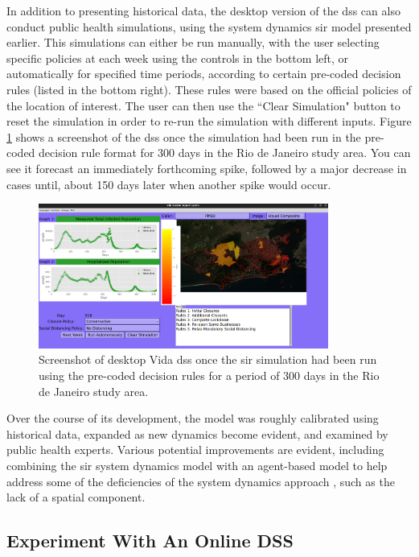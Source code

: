 In addition to presenting historical data, the desktop version of the \ac{dss} can also conduct public health simulations, using the system dynamics \ac{sir} model presented earlier. This simulations can either be run manually, with the user selecting specific policies at each week using the controls in the bottom left, or automatically for specified time periods, according to certain pre-coded decision rules (listed in the bottom right). These rules were based on the official policies of the location of interest. The user can then use the ``Clear Simulation" button to reset the simulation in order to re-run the simulation with different inputs. Figure \ref{fig:vida-dss-simulation} shows a screenshot of the \ac{dss} once the simulation had been run in the pre-coded decision rule format for 300 days in the Rio de Janeiro study area. You can see it forecast an immediately forthcoming spike, followed by a major decrease in cases until, about 150 days later when another spike would occur.

\begin{figure}[!htb]
\centering
\includegraphics[width=0.85\textwidth]{Figures/chap5/vida-screenshot-simulation.png}
\caption[Vida DSS SIR Simulation Screenshot]{Screenshot of desktop Vida \ac{dss} once the \ac{sir} simulation had been run using the pre-coded decision rules for a period of 300 days in the Rio de Janeiro study area.}
\label{fig:vida-dss-simulation}
\end{figure}

Over the course of its development, the model was roughly calibrated using historical data, expanded as new dynamics become evident, and examined by public health experts. Various potential improvements are evident, including combining the \ac{sir} system dynamics model with an agent-based model to help address some of the deficiencies of the system dynamics approach \cite{ahmedVarianceSystemDynamics2012}, such as the lack of a spatial component.

\subsection{Experiment With An Online DSS}

